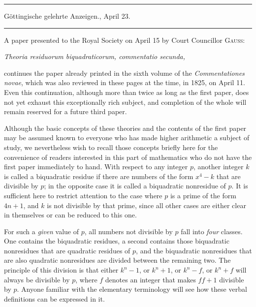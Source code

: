 \clearpage
{}
\begin{center}
\rule{.82\linewidth}{.35pt}\par
Göttingische gelehrte Anzeigen., April 23.\par
\rule{.82\linewidth}{.35pt}
\end{center}
A paper presented to the Royal Society on April 15 by Court Councillor \textsc{Gauss}:
\begin{center}\itshape
Theoria residuorum biquadraticorum, commentatio secunda,
\end{center}
continues the paper already printed in the sixth volume of the \emph{Commentationes novae}, which was also reviewed in these pages at the time, in 1825, on April 11. Even this continuation, although more than twice as long as the first paper, does not yet exhaust this exceptionally rich subject, and completion of the whole will remain reserved for a future third paper.

Although the basic concepts of these theories and the contents of the first paper may be assumed known to everyone who has made higher arithmetic a subject of study, we nevertheless wish to recall those concepts briefly here for the convenience of readers interested in this part of mathematics who do not have the first paper immediately to hand. With respect to any integer $p$, another integer $k$ is called a biquadratic residue if there are numbers of the form $x^4-k$ that are divisible by $p$; in the opposite case it is called a biquadratic nonresidue of $p$. It is sufficient here to restrict attention to the case where $p$ is a prime of the form $4n+1$, and $k$ is not divisible by
that prime, since all other cases are either clear in themselves or can be reduced to this one.

For such a \emph{given} value of $p$, all numbers not divisible by $p$ fall into \emph{four} classes. One contains the biquadratic residues, a second contains those biquadratic nonresidues that are quadratic residues of $p$, and the biquadratic nonresidues that are also quadratic nonresidues are divided between the remaining two. The principle of this division is that either $k^n-1$, or $k^n+1$, or $k^n-f$, or $k^n+f$ will always be divisible by $p$, where $f$ denotes an integer that makes $ff+1$ divisible by $p$. Anyone familiar with the elementary terminology will see how these verbal definitions can be expressed in it.

